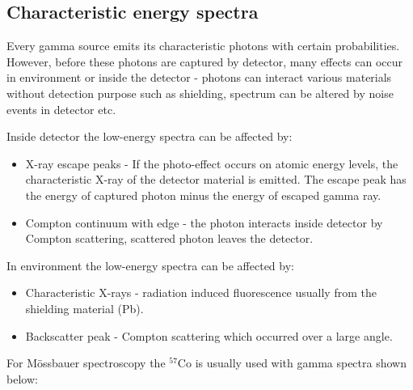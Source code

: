 \subsection{Characteristic energy spectra}
\label{char}
Every gamma source emits its characteristic photons with certain probabilities. However, before these photons are captured by detector, many effects can occur in environment or inside the detector - photons can interact various materials without detection purpose such as shielding, spectrum can be altered by 
noise events in detector etc.
\par
Inside detector the low-energy spectra can be affected by:
\begin{itemize}
\item X-ray escape peaks - If the photo-effect occurs on atomic energy levels, the characteristic X-ray of the detector material is emitted. The escape peak has the energy of captured photon minus the energy of escaped gamma ray.
\item Compton continuum with edge - the photon interacts inside detector by Compton scattering, scattered photon leaves the detector.

\end{itemize}

In environment the low-energy spectra can be affected by:
\begin{itemize}
\item Characteristic X-rays - radiation induced fluorescence usually from the shielding material (Pb).
\item Backscatter peak - Compton scattering which occurred over a large angle.
\end{itemize}


For Mössbauer spectroscopy the $^{57}$Co is usually used with gamma spectra shown below:


